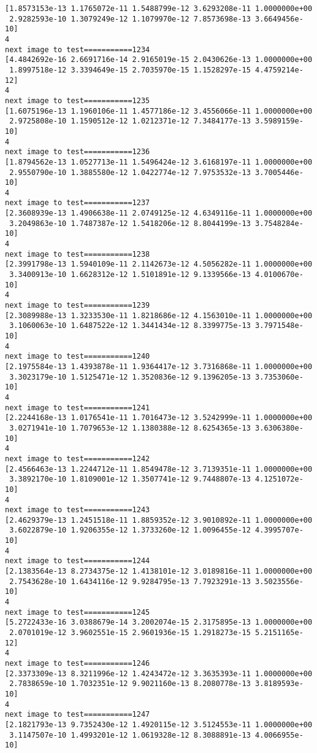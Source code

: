 \documentclass[11pt]{article}
\begin{document}
\begin{Verbatim}[commandchars=\\\{\}]
[1.8573153e-13 1.1765072e-11 1.5488799e-12 3.6293208e-11 1.0000000e+00
 2.9282593e-10 1.3079249e-12 1.1079970e-12 7.8573698e-13 3.6649456e-10]
4
next image to test===========1234
[4.4842692e-16 2.6691716e-14 2.9165019e-15 2.0430626e-13 1.0000000e+00
 1.8997518e-12 3.3394649e-15 2.7035970e-15 1.1528297e-15 4.4759214e-12]
4
next image to test===========1235
[1.6075196e-13 1.1960106e-11 1.4577186e-12 3.4556066e-11 1.0000000e+00
 2.9725808e-10 1.1590512e-12 1.0212371e-12 7.3484177e-13 3.5989159e-10]
4
next image to test===========1236
[1.8794562e-13 1.0527713e-11 1.5496424e-12 3.6168197e-11 1.0000000e+00
 2.9550790e-10 1.3885580e-12 1.0422774e-12 7.9753532e-13 3.7005446e-10]
4
next image to test===========1237
[2.3608939e-13 1.4906638e-11 2.0749125e-12 4.6349116e-11 1.0000000e+00
 3.2049863e-10 1.7487387e-12 1.5418206e-12 8.8044199e-13 3.7548284e-10]
4
next image to test===========1238
[2.3991798e-13 1.5940109e-11 2.1142673e-12 4.5056282e-11 1.0000000e+00
 3.3400913e-10 1.6628312e-12 1.5101891e-12 9.1339566e-13 4.0100670e-10]
4
next image to test===========1239
[2.3089988e-13 1.3233530e-11 1.8218686e-12 4.1563010e-11 1.0000000e+00
 3.1060063e-10 1.6487522e-12 1.3441434e-12 8.3399775e-13 3.7971548e-10]
4
next image to test===========1240
[2.1975584e-13 1.4393878e-11 1.9364417e-12 3.7316868e-11 1.0000000e+00
 3.3023179e-10 1.5125471e-12 1.3520836e-12 9.1396205e-13 3.7353060e-10]
4
next image to test===========1241
[2.2244168e-13 1.0176541e-11 1.7016473e-12 3.5242999e-11 1.0000000e+00
 3.0271941e-10 1.7079653e-12 1.1380388e-12 8.6254365e-13 3.6306380e-10]
4
next image to test===========1242
[2.4566463e-13 1.2244712e-11 1.8549478e-12 3.7139351e-11 1.0000000e+00
 3.3892170e-10 1.8109001e-12 1.3507741e-12 9.7448807e-13 4.1251072e-10]
4
next image to test===========1243
[2.4629379e-13 1.2451518e-11 1.8859352e-12 3.9010892e-11 1.0000000e+00
 3.6022879e-10 1.9206355e-12 1.3733260e-12 1.0096455e-12 4.3995707e-10]
4
next image to test===========1244
[2.1383564e-13 8.2734375e-12 1.4138101e-12 3.0189816e-11 1.0000000e+00
 2.7543628e-10 1.6434116e-12 9.9284795e-13 7.7923291e-13 3.5023556e-10]
4
next image to test===========1245
[5.2722433e-16 3.0388679e-14 3.2002074e-15 2.3175895e-13 1.0000000e+00
 2.0701019e-12 3.9602551e-15 2.9601936e-15 1.2918273e-15 5.2151165e-12]
4
next image to test===========1246
[2.3373309e-13 8.3211996e-12 1.4243472e-12 3.3635393e-11 1.0000000e+00
 2.7838659e-10 1.7032351e-12 9.9021160e-13 8.2080778e-13 3.8189593e-10]
4
next image to test===========1247
[2.1821793e-13 9.7352430e-12 1.4920115e-12 3.5124553e-11 1.0000000e+00
 3.1147507e-10 1.4993201e-12 1.0619328e-12 8.3088891e-13 4.0066955e-10]

\end{Verbatim}
\end{document}
